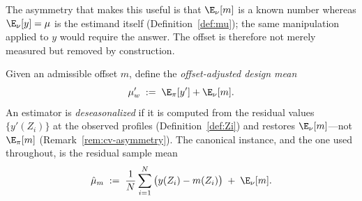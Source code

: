 The asymmetry that makes this useful is that $\E_\nu[m]$ is a known
number whereas $\E_\nu[y]=\mu$ is the estimand itself
(Definition~\ref{def:mu}); the same manipulation applied to $y$ would
require the answer. The offset is therefore not merely measured but
removed by construction.

\begin{definition}
\label{def:deseason-est}
Given an admissible offset $m$, define the \emph{offset-adjusted design
mean}
\begin{equation}
  \mu_w' \;:=\; \E_\pi[y']+\E_\nu[m].
  \label{eq:mu-w-prime}
\end{equation}
An estimator is \emph{deseasonalized} if it is computed from the residual
values $\{y'(Z_i)\}$ at the observed profiles
(Definition~\ref{def:Zi}) and restores $\E_\nu[m]$---not $\E_\pi[m]$
(Remark~\ref{rem:cv-asymmetry}). The canonical instance, and the one used
throughout, is the residual sample mean
\begin{equation}
  \hat\mu_m
  \;:=\;\frac1N\sum_{i=1}^{N}\big(y(Z_i)-m(Z_i)\big)\;+\;\E_\nu[m].
  \label{eq:deseason-est}
\end{equation}
\end{definition}

